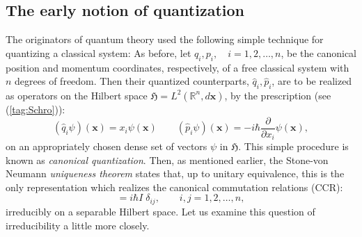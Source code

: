 \documentclass[11pt]{amsart}
\numberwithin{equation}{section}
\theoremstyle{remark}
\newcommand\HH{\mathfrak H}
\newcommand{\be}{\begin{equation}}
\newcommand{\en}{\end{equation}}
\newcommand{\bx}{\mathbf x}
\begin{document}
\subsection{The early notion of quantization}
\label{sec-earlynotion}

The originators of quantum theory used the following simple technique
for quantizing a classical system: As before, let
 $q_{i}, p_{i}, \quad i = 1,2,
\ldots , n$, be the canonical position and momentum coordinates, respectively,
of a free classical system with $n$ degrees of freedom. Then their quantized
counterparts, $\widehat{q}_{i}, \widehat{p}_{i}$, are to be realized as
operators on the Hilbert space $\HH = L^{2}({\mathbb R}^{n}, d\bx)$, by the
prescription (see (\ref{tag:Schro})):
\be
  (\widehat{q}_{i}\psi )(\bx ) = x_{i}\psi (\bx )  \qquad
    (\widehat{p}_{i}\psi )(\bx ) = -i\hbar
    \frac {\partial}{\partial x_{i}}\psi (\bx),
\label{canquant1}
\en
on an appropriately chosen dense set of vectors $\psi$ in $\HH$. This simple
procedure is known as {\em canonical quantization\/}.   Then, as mentioned
earlier, the Stone-von Neumann {\em uniqueness theorem} \cite{bib:vNeu} states
that, up to unitary equivalence,
this is the only
representation which realizes the canonical commutation relations (CCR):
\be
 [\widehat{q}_{i}, \widehat{p}_{j}] = i\hbar I\; \delta_{ij},
      \qquad i,j = 1,2, \ldots, n,
\label{CCR4}
\en
irreducibly on a separable Hilbert space. Let us examine this question
of irreducibility a little more closely.
\end{document}
